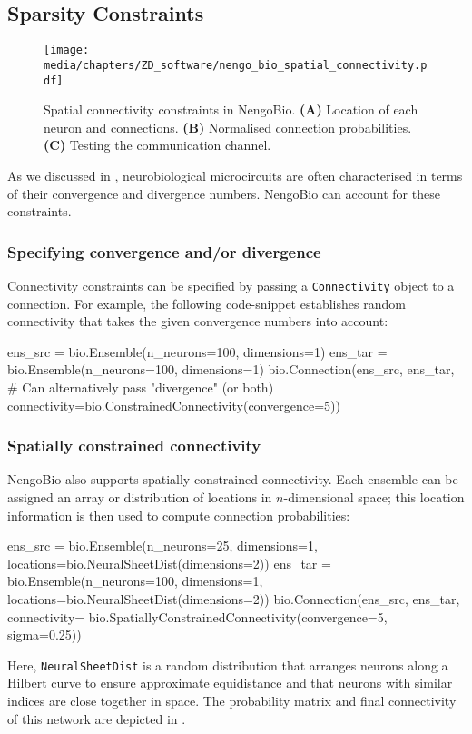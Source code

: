 \subsection{Sparsity Constraints}
\label{sec:nengo_bio_sparsity}

\begin{figure}
	\centering
	\texttt{[image: media/chapters/ZD\_software/nengo\_bio\_spatial\_connectivity.pdf]}
	\caption[Spatial connectivity constraints in NengoBio]{
		Spatial connectivity constraints in NengoBio.
		\textbf{(A)} Location of each neuron and connections.
		\textbf{(B)} Normalised connection probabilities.
		\textbf{(C)} Testing the communication channel.
	}
	\label{fig:nengo_bio_spatial_connectivity}
\end{figure}

As we discussed in , neurobiological microcircuits are often characterised in terms of their convergence and divergence numbers.
NengoBio can account for these constraints.

\subsubsection{Specifying convergence and/or divergence}
Connectivity constraints can be specified by passing a \texttt{Connectivity} object to a connection.
For example, the following code-snippet establishes random connectivity that takes the given convergence numbers into account:
\begin{pythoncode}
ens_src = bio.Ensemble(n_neurons=100, dimensions=1)
ens_tar = bio.Ensemble(n_neurons=100, dimensions=1)
bio.Connection(ens_src, ens_tar, # Can alternatively pass "divergence" (or both)
               connectivity=bio.ConstrainedConnectivity(convergence=5))
\end{pythoncode}

\subsubsection{Spatially constrained connectivity}
NengoBio also supports spatially constrained connectivity.
Each ensemble can be assigned an array or distribution of locations in $n$-dimensional space; this location information is then used to compute connection probabilities:
\begin{pythoncode}
ens_src = bio.Ensemble(n_neurons=25, dimensions=1,
                       locations=bio.NeuralSheetDist(dimensions=2))
ens_tar = bio.Ensemble(n_neurons=100, dimensions=1,
                       locations=bio.NeuralSheetDist(dimensions=2))
bio.Connection(ens_src, ens_tar, connectivity=
               bio.SpatiallyConstrainedConnectivity(convergence=5, sigma=0.25))
\end{pythoncode}
Here, \texttt{NeuralSheetDist} is a random distribution that arranges neurons along a Hilbert curve to ensure approximate equidistance and that neurons with similar indices are close together in space.
The probability matrix and final connectivity of this network are depicted in .

